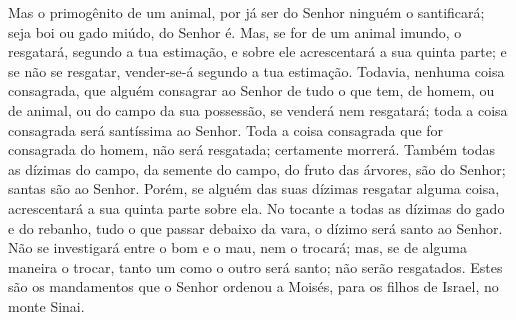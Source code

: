 Mas o primogênito de um animal, por já ser do Senhor ninguém o
santificará; seja boi ou gado miúdo, do Senhor é. Mas, se for
de um animal imundo, o resgatará, segundo a tua estimação, e sobre
ele acrescentará a sua quinta parte; e se não se resgatar,
vender-se-á segundo a tua estimação. Todavia, nenhuma coisa
consagrada, que alguém consagrar ao Senhor de tudo o que tem, de
homem, ou de animal, ou do campo da sua possessão, se venderá nem
resgatará; toda a coisa consagrada será santíssima ao Senhor.
Toda a coisa consagrada que for consagrada do homem, não será
resgatada; certamente morrerá. Também todas as dízimas do
campo, da semente do campo, do fruto das árvores, são do Senhor;
santas são ao Senhor. Porém, se alguém das suas dízimas
resgatar alguma coisa, acrescentará a sua quinta parte sobre ela.
No tocante a todas as dízimas do gado e do rebanho, tudo o
que passar debaixo da vara, o dízimo será santo ao Senhor.
Não se investigará entre o bom e o mau, nem o trocará; mas,
se de alguma maneira o trocar, tanto um como o outro será santo; não
serão resgatados. Estes são os mandamentos que o Senhor
ordenou a Moisés, para os filhos de Israel, no monte Sinai.

